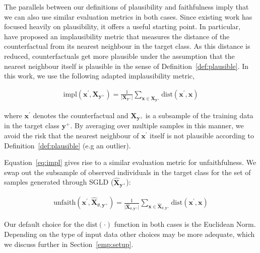 The parallels between our definitions of plausibility and faithfulness imply that we can also use similar evaluation metrics in both cases. Since existing work has focused heavily on plausibility, it offers a useful starting point. In particular,~\citet{guidotti2022counterfactual} have proposed an implausibility metric that measures the distance of the counterfactual from its nearest neighbour in the target class. As this distance is reduced, counterfactuals get more plausible under the assumption that the nearest neighbour itself is plausible in the sense of Definition~\ref{def:plausible}. In this work, we use the following adapted implausibility metric,

\begin{equation}\label{eq:impl}
  \begin{aligned}
    \text{impl}(\mathbf{x}^{\prime},\mathbf{X}_{\mathbf{y}^+}) = \frac{1}{\lvert\mathbf{X}_{\mathbf{y}^+}\rvert} \sum_{\mathbf{x} \in \mathbf{X}_{\mathbf{y}^+}} \text{dist}(\mathbf{x}^{\prime},\mathbf{x})
  \end{aligned}
\end{equation}

where $\mathbf{x}^{\prime}$ denotes the counterfactual and $\mathbf{X}_{\mathbf{y}^+}$ is a subsample of the training data in the target class $\mathbf{y}^+$. By averaging over multiple samples in this manner, we avoid the risk that the nearest neighbour of $\mathbf{x}^{\prime}$ itself is not plausible according to Definition~\ref{def:plausible} (e.g an outlier).

Equation~\ref{eq:impl} gives rise to a similar evaluation metric for unfaithfulness. We swap out the subsample of observed individuals in the target class for the set of samples generated through SGLD ($\widehat{\mathbf{X}}_{\mathbf{y}^+}$):

\begin{equation}\label{eq:faith}
  \begin{aligned}
    \text{unfaith}(\mathbf{x}^{\prime},\widehat{\mathbf{X}}_{\theta,\mathbf{y}^+}) = \frac{1}{\lvert \widehat{\mathbf{X}}_{\theta,\mathbf{y}^+} \rvert} \sum_{\mathbf{x} \in \widehat{\mathbf{X}}_{\theta,\mathbf{y}^+}} \text{dist}(\mathbf{x}^{\prime},\mathbf{x})
  \end{aligned}
\end{equation}

Our default choice for the $\text{dist}(\cdot)$ function in both cases is the Euclidean Norm. Depending on the type of input data other choices may be more adequate, which we discuss further in Section~\ref{emp:setup}. 

